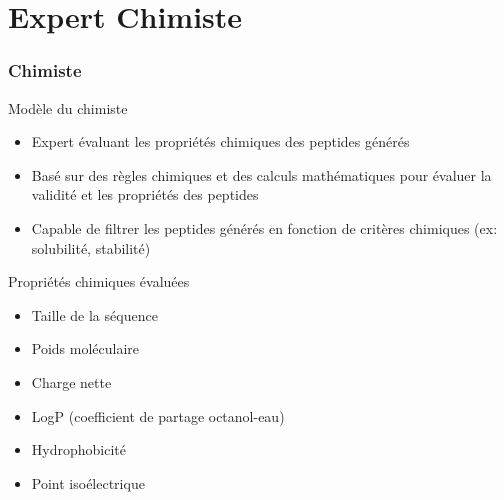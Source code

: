 \section{Expert Chimiste}
\begin{frame}
    \frametitle{Chimiste}
    \begin{block}{Modèle du chimiste}
        \begin{itemize}
        \item Expert évaluant les propriétés chimiques des peptides générés
        \item Basé sur des règles chimiques et des calculs mathématiques pour évaluer la validité et les propriétés des peptides
        \item Capable de filtrer les peptides générés en fonction de critères chimiques (ex: solubilité, stabilité)
        \end{itemize}
    \end{block}
    \begin{block}{Propriétés chimiques évaluées}
        \begin{itemize}
            \item Taille de la séquence
            \item Poids moléculaire
            \item Charge nette
            \item LogP (coefficient de partage octanol-eau)
            \item Hydrophobicité
            \item Point isoélectrique
        \end{itemize}
    \end{block}
\end{frame}